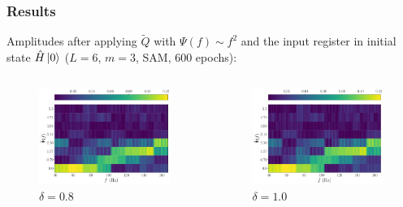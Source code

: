 \documentclass{beamer}
\begin{document}
\begin{frame}
\frametitle{Results}
Amplitudes after applying $\tilde{Q}$ with $\Psi(f) \sim f^2$ and the input register in initial state $\hat{H} \ket{0}$ ($L=6$, $m=3$, SAM, 600 epochs):
\begin{columns}
\begin{column}{0.5\textwidth}
\begin{figure}
\centering
\includegraphics[width=\textwidth]{im/Q_amp_quadratic_0.8_H.pdf}
\caption{$\delta =0.8$}
\end{figure}
\end{column}
\begin{column}{0.5\textwidth}
\begin{figure}
\centering
\includegraphics[width=\textwidth]{im/Q_amp_quadratic_1.0_H.pdf}
\caption{$\delta =1.0$}
\end{figure} 
\end{column}
\end{columns}
\end{frame}
\end{document}
